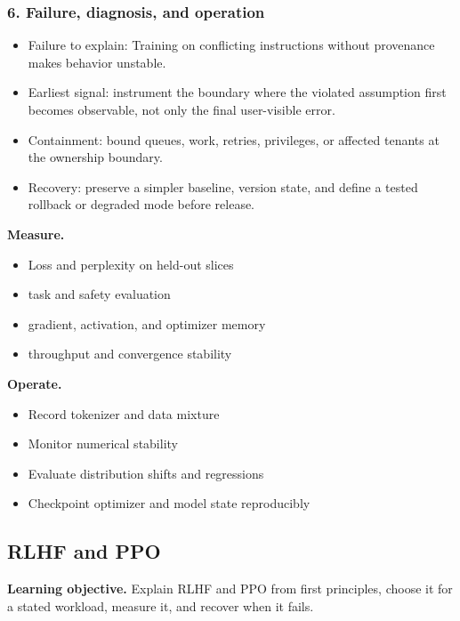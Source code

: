 \subsubsection*{6. Failure, diagnosis, and operation}
\begin{itemize}
\item Failure to explain: Training on conflicting instructions without provenance makes behavior unstable.
\item Earliest signal: instrument the boundary where the violated assumption first becomes observable, not only the final user-visible error.
\item Containment: bound queues, work, retries, privileges, or affected tenants at the ownership boundary.
\item Recovery: preserve a simpler baseline, version state, and define a tested rollback or degraded mode before release.
\end{itemize}
\textbf{Measure.}\begin{itemize}
\item Loss and perplexity on held-out slices
\item task and safety evaluation
\item gradient, activation, and optimizer memory
\item throughput and convergence stability
\end{itemize}
\textbf{Operate.}\begin{itemize}
\item Record tokenizer and data mixture
\item Monitor numerical stability
\item Evaluate distribution shifts and regressions
\item Checkpoint optimizer and model state reproducibly
\end{itemize}
\subsection{RLHF and PPO}
\textbf{Learning objective.} Explain RLHF and PPO from first principles, choose it for a stated workload, measure it, and recover when it fails.
